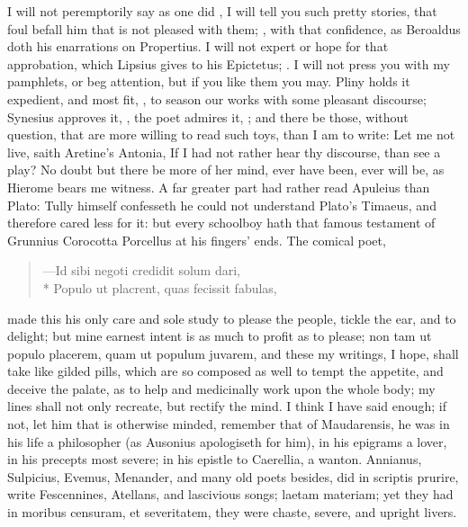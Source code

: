 {I will not peremptorily say as one did , I will tell you such pretty
stories, that foul befall him that is not pleased with them; , with
that confidence, as Beroaldus doth his enarrations on Propertius. I
will not expert or hope for that approbation, which Lipsius gives to
his Epictetus; . I will not
press you with my pamphlets, or beg attention, but if you
like them you may. Pliny holds it expedient, and most fit, , to season our works with some
pleasant discourse; Synesius approves it, , the
poet admires it, ; and
there be those, without question, that are more willing to read such
toys, than I am to write: Let me not live, saith Aretine's
Antonia, If I had not rather hear thy discourse, than see a play?
No doubt but there be more of her mind, ever have been, ever will be,
as Hierome bears me witness. A far greater part had rather read
Apuleius than Plato: Tully himself confesseth he could not understand
Plato's Timaeus, and therefore cared less for it: but every schoolboy
hath that famous testament of Grunnius Corocotta Porcellus at his
fingers' ends. The comical poet,

\begin{latin}
\begin{verse}
---Id sibi negoti credidit solum dari,\\*
Populo ut placrent, quas fecissit fabulas,
\end{verse}
\end{latin}

made this his only care and sole study to please the people, tickle the
ear, and to delight; but mine earnest intent is as much to profit as to
please; non tam ut populo placerem, quam ut populum juvarem, and these
my writings, I hope, shall take like gilded pills, which are so
composed as well to tempt the appetite, and deceive the palate, as to
help and medicinally work upon the whole body; my lines shall not only
recreate, but rectify the mind. I think I have said enough; if not, let
him that is otherwise minded, remember that of Maudarensis, he
was in his life a philosopher (as Ausonius apologiseth for him), in his
epigrams a lover, in his precepts most severe; in his epistle to
Caerellia, a wanton. Annianus, Sulpicius, Evemus, Menander, and many
old poets besides, did in scriptis prurire, write Fescennines,
Atellans, and lascivious songs; laetam materiam; yet they had in
moribus censuram, et severitatem, they were chaste, severe, and upright
livers.

}
